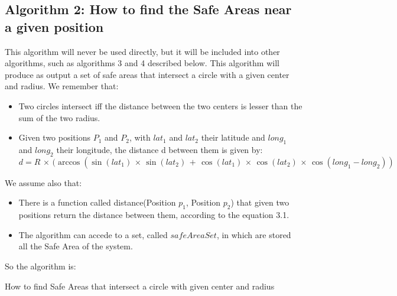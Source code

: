\subsection{Algorithm 2: How to find the Safe Areas near a given position}
This algorithm will never be used directly, but it will be included into other algorithms, such as algorithms 3 and 4 described below. 
This algorithm will produce as output a set of safe areas that intersect a circle with a given center and radius.
We remember that:
\begin{itemize}
\item Two circles intersect iff the distance between the two centers is lesser than the sum of the two radius.
\item Given two positions $P_{1}$ and $P_{2}$, with $lat_{1}$ and $lat_{2}$ their latitude and $long_{1}$ and $long_{2}$ their longitude, the distance d between them is given by:
\begin{equation}
d = R\,\times\,(\arccos (\sin (lat_{1})\, \times\, \sin (lat_{2})\, +\, \cos (lat_{1})\, \times\, \cos (lat_{2})\, \times\, \cos(long_{1} - long_{2}))
\end{equation}
\end{itemize}
We assume also that:
\begin{itemize}
\item There is a function called distance(Position $p_{1}$, Position $p_{2}$) that given two positions return the distance between them, according to the equation 3.1.
\item The algorithm can accede to a set, called $safeAreaSet$, in which are stored all the Safe Area of the system.
\end{itemize}

So the algorithm is:

\begin{algorithm}[H]


	\BlankLine
{}
\Return \Res \;
\caption{How to find Safe Areas that intersect a circle with given center and radius}
\end{algorithm}